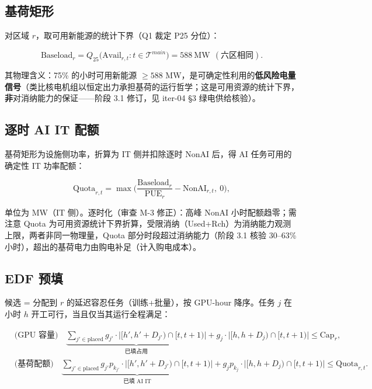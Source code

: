 \documentclass{internal-report}
\begin{document}
\subsection{基荷矩形}

对区域 $r$，取可用新能源的统计下界（Q1 裁定 P25 分位）：

\begin{equation}
  \text{Baseload}_r = Q_{25}\big( \text{Avail}_{r,t}: t\in\mathcal{T}^{main} \big) = 588\ \text{MW}\ \ (\text{六区相同}).
  \label{eq:baseload}
\end{equation}

其物理含义：75\% 的小时可用新能源 $\ge 588$ MW，是可确定性利用的\textbf{低风险电量信号}（类比核电机组以恒定出力承担基荷的运行哲学；这是可用资源的统计下界，\textbf{非}对消纳能力的保证——阶段 3.1 修订，见 iter-04 §3 绿电供给核验）。

\subsection{逐时 AI IT 配额}

基荷矩形为设施侧功率，折算为 IT 侧并扣除逐时 NonAI 后，得 AI 任务可用的确定性 IT 功率配额：

\begin{equation}
  \text{Quota}_{r,t} = \max\Big( \frac{\text{Baseload}_r}{\text{PUE}_r} - \text{NonAI}_{r,t},\ 0 \Big),
  \label{eq:quota}
\end{equation}

单位为 MW（IT 侧）。逐时化（审查 M-3 修正）：高峰 NonAI 小时配额趋零；需注意 Quota 为可用资源统计下界折算，受限消纳（Used+Rch）为消纳能力观测上限，两者非同一物理量，Quota 部分时段超过消纳能力（阶段 3.1 核验 30--63\% 小时），超出的基荷电力由购电补足（计入购电成本）。

\subsection{EDF 预填}

候选 = 分配到 $r$ 的延迟容忍任务（训练+批量），按 GPU-hour 降序。任务 $j$ 在小时 $h$ 开工可行，当且仅当其运行全程满足：

\begin{align}
  &\text{(GPU 容量)}\quad
  \underbrace{\sum_{j'\in\text{placed}} g_{j'} \cdot \big|[h',h'+D_{j'})\cap[t,t+1)\big|}_{\text{已填占用}}
  + g_j \cdot \big|[h,h+D_j)\cap[t,t+1)\big| \le \text{Cap}_r, \label{eq:edf1}\\
  &\text{(基荷配额)}\quad
  \underbrace{\sum_{j'\in\text{placed}} g_{j'} p_{k_{j'}} \cdot \big|[h',h'+D_{j'})\cap[t,t+1)\big|}_{\text{已填 AI IT}}
  + g_j p_{k_j} \cdot \big|[h,h+D_j)\cap[t,t+1)\big| \le \text{Quota}_{r,t}. \label{eq:edf2}
\end{align}
\end{document}

